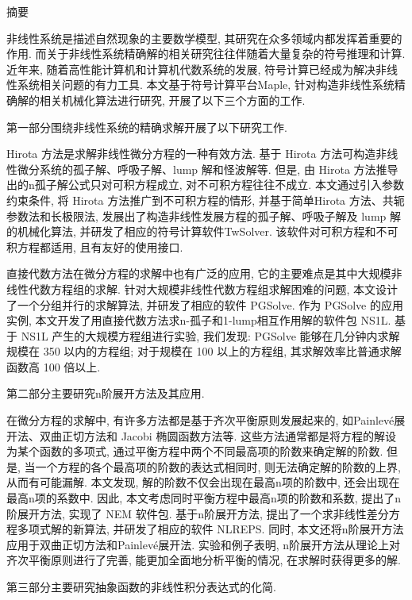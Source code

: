 {}
\centerline{\heiti 摘\quad 要}

\linespread{1.4} \bigskip

非线性系统是描述自然现象的主要数学模型, 其研究在众多领域内都发挥着重要的作用. 而关于非线性系统精确解的相关研究往往伴随着大量复杂的符号推理和计算. 近年来, 随着高性能计算机和计算机代数系统的发展, 符号计算已经成为解决非线性系统相关问题的有力工具. 本文基于符号计算平台Maple, 针对构造非线性系统精确解的相关机械化算法进行研究, 开展了以下三个方面的工作. 

第一部分围绕非线性系统的精确求解开展了以下研究工作. 

Hirota 方法是求解非线性微分方程的一种有效方法. 基于 Hirota 方法可构造非线性微分系统的孤子解、呼吸子解、lump 解和怪波解等. 但是, 由 Hirota 方法推导出的n孤子解公式只对可积方程成立, 对不可积方程往往不成立. 本文通过引入参数约束条件, 将 Hirota 方法推广到不可积方程的情形, 并基于简单Hirota 方法、共轭参数法和长极限法, 发展出了构造非线性发展方程的孤子解、呼吸子解及 lump 解的机械化算法, 并研发了相应的符号计算软件TwSolver. 该软件对可积方程和不可积方程都适用, 且有友好的使用接口. 

直接代数方法在微分方程的求解中也有广泛的应用, 它的主要难点是其中大规模非线性代数方程组的求解. 针对大规模非线性代数方程组求解困难的问题, 本文设计了一个分组并行的求解算法, 并研发了相应的软件 PGSolve. 作为 PGSolve 的应用实例, 本文开发了用直接代数方法求n-孤子和1-lump相互作用解的软件包 NS1L. 基于 NS1L 产生的大规模方程组进行实验, 我们发现: PGSolve 能够在几分钟内求解规模在 350 以内的方程组; 对于规模在 100 以上的方程组, 其求解效率比普通求解函数高 100 倍以上. 

第二部分主要研究n阶展开方法及其应用. 

在微分方程的求解中, 有许多方法都是基于齐次平衡原则发展起来的, 如Painlevé展开法、双曲正切方法和 Jacobi 椭圆函数方法等. 这些方法通常都是将方程的解设为某个函数的多项式, 通过平衡方程中两个不同最高项的阶数来确定解的阶数. 但是, 当一个方程的各个最高项的阶数的表达式相同时, 则无法确定解的阶数的上界, 从而有可能漏解. 本文发现, 解的阶数不仅会出现在最高n项的阶数中, 还会出现在最高n项的系数中. 因此, 本文考虑同时平衡方程中最高n项的阶数和系数, 提出了n阶展开方法, 实现了 NEM 软件包. 基于n阶展开方法, 提出了一个求非线性差分方程多项式解的新算法, 并研发了相应的软件 NLREPS. 同时, 本文还将n阶展开方法应用于双曲正切方法和Painlevé展开法. 实验和例子表明, n阶展开方法从理论上对齐次平衡原则进行了完善, 能更加全面地分析平衡的情况, 在求解时获得更多的解. 

第三部分主要研究抽象函数的非线性积分表达式的化简.

